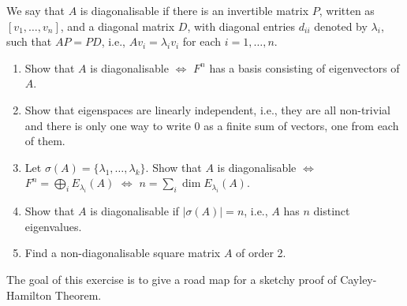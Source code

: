 \begin{problem}
We say that $A$ is diagonalisable if there is an invertible matrix $P$, written as $[v_1, \ldots, v_n]$, and a diagonal matrix $D$, with diagonal entries $d_{ii}$ denoted by $\lambda_i$, such that $AP = PD$, i.e., $A v_i = \lambda_i v_i$ for each $i = 1, \ldots, n$.
\begin{enumerate}
  \item Show that $A$ is diagonalisable $\iff$ $F^n$ has a basis consisting of eigenvectors of $A$.
  \item Show that eigenspaces are linearly independent, i.e., they are all non-trivial and there is only one way to write $0$ as a finite sum of vectors, one from each of them.
  \item Let $\sigma(A) = \{ \lambda_1, \ldots, \lambda_k \}$. Show that $A$ is diagonalisable $\iff$ $F^n = \bigoplus_i E_{\lambda_i} (A)$ $\iff$ $n = \sum_i \dim E_{\lambda_i} (A)$.
  \item Show that $A$ is diagonalisable if $|\sigma(A)| = n$, i.e., $A$ has $n$ distinct eigenvalues.
  \item Find a non-diagonalisable square matrix $A$ of order 2.
\end{enumerate}
\end{problem}

\begin{remark}
  The goal of this exercise is to give a road map for a sketchy proof of Cayley-Hamilton Theorem.
\end{remark}

